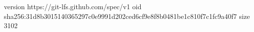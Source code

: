 version https://git-lfs.github.com/spec/v1
oid sha256:31d8b3015140365297c0e9991d202ced6cf9e8f8b0481be1c810f7c1fc9a40f7
size 3102
